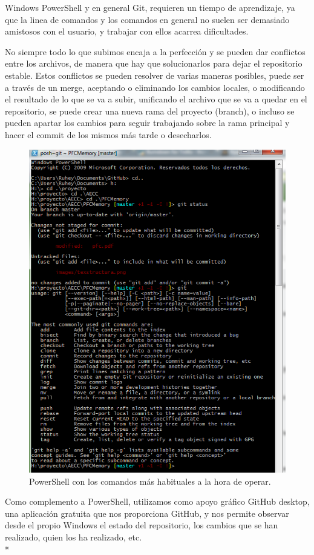 \documentclass[../pfc.tex]{subfiles}
\begin{document}
	Windows PowerShell y en general Git, requieren un tiempo de aprendizaje, ya que la linea de comandos y los comandos en general no suelen ser demasiado amistosos con el usuario, y trabajar con ellos acarrea dificultades.
	
	No siempre todo lo que subimos encaja a la perfección y se pueden dar conflictos entre los archivos, de manera que hay que solucionarlos para dejar el repositorio estable.
	Estos conflictos se  pueden resolver de varias maneras posibles, puede ser a través de un merge, aceptando o eliminando los cambios locales, o modificando el resultado de lo que se va a subir, unificando el archivo que se va a quedar en el repositorio, se puede crear una nueva rama del proyecto (branch), o incluso se pueden apartar los cambios para seguir trabajando sobre la rama principal y hacer el commit de los mismos más tarde o desecharlos.
	
	\begin{figure}[H]
		\centering
		\includegraphics[width=0.7\linewidth]{../images/powerShell}
		\caption{PowerShell con los comandos más habituales a la hora de operar.}
		\label{fig:powershell}
	\end{figure}
	
	Como complemento a PowerShell, utilizamos como apoyo gráfico GitHub desktop, una aplicación gratuita que nos proporciona GitHub, y nos permite observar desde el propio Windows el estado del repositorio, los cambios que se han realizado, quien los ha realizado, etc.\\*
	
\end{document}
